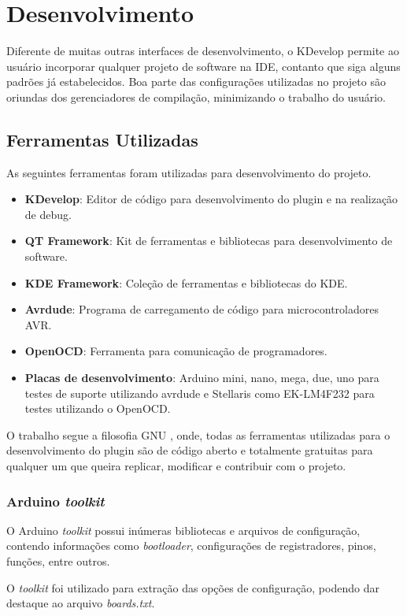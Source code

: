 \chapter{Desenvolvimento}

Diferente de muitas outras interfaces de desenvolvimento, o KDevelop permite ao usuário incorporar qualquer projeto de software na IDE, contanto que siga alguns padrões já estabelecidos. Boa parte das configurações utilizadas no projeto são oriundas dos gerenciadores de compilação, minimizando o trabalho do usuário.

\section{Ferramentas Utilizadas}
As seguintes ferramentas foram utilizadas para desenvolvimento do projeto.
\begin{itemize}
 \item \textbf{KDevelop}: Editor de código para desenvolvimento do plugin e na realização de debug.
 \item \textbf{QT Framework}: Kit de ferramentas e bibliotecas para desenvolvimento de software.
 \item \textbf{KDE Framework}: Coleção de ferramentas e bibliotecas do KDE.
 \item \textbf{Avrdude}: Programa de carregamento de código para microcontroladores AVR.
 \item \textbf{OpenOCD}: Ferramenta para comunicação de programadores.
 \item \textbf{Placas de desenvolvimento}: Arduino mini, nano, mega, due, uno para testes de suporte utilizando avrdude e Stellaris como EK-LM4F232 para testes utilizando o OpenOCD.
\end{itemize}

O trabalho segue a filosofia GNU \cite{filosofia}, onde, todas as ferramentas utilizadas para o desenvolvimento do plugin são de código aberto e totalmente gratuitas para qualquer um que queira replicar, modificar e contribuir com o projeto.


\subsection{Arduino \textit{toolkit}}
O Arduino \textit{toolkit} possui inúmeras bibliotecas e arquivos de configuração, contendo informações como \textit{bootloader}, configurações de registradores, pinos, funções, entre outros.

O \textit{toolkit} foi utilizado para extração das opções de configuração, podendo dar destaque ao arquivo \textit{boards.txt}.

